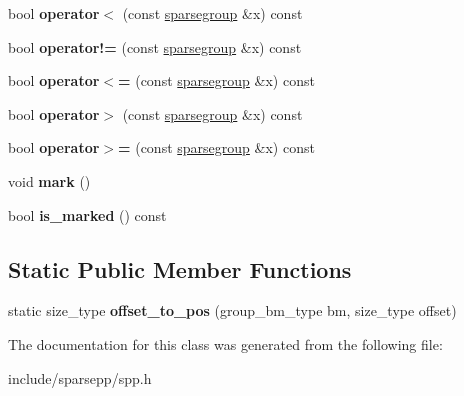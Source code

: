 \begin{DoxyCompactItemize}
\item 
bool {\bfseries operator$<$} (const \hyperlink{classspp___1_1sparsegroup}{sparsegroup} \&x) const \hypertarget{classspp___1_1sparsegroup_ae0e61b3467b0cb2c52a2d6a678966e03}{}\label{classspp___1_1sparsegroup_ae0e61b3467b0cb2c52a2d6a678966e03}

\item 
bool {\bfseries operator!=} (const \hyperlink{classspp___1_1sparsegroup}{sparsegroup} \&x) const \hypertarget{classspp___1_1sparsegroup_a2d51d3cd462d21506a8719d0058ceacf}{}\label{classspp___1_1sparsegroup_a2d51d3cd462d21506a8719d0058ceacf}

\item 
bool {\bfseries operator$<$=} (const \hyperlink{classspp___1_1sparsegroup}{sparsegroup} \&x) const \hypertarget{classspp___1_1sparsegroup_a8e22369b827ab8347b88507f3d99df89}{}\label{classspp___1_1sparsegroup_a8e22369b827ab8347b88507f3d99df89}

\item 
bool {\bfseries operator$>$} (const \hyperlink{classspp___1_1sparsegroup}{sparsegroup} \&x) const \hypertarget{classspp___1_1sparsegroup_a483397eb3c0c3cc30ac3ba18e68a2ccf}{}\label{classspp___1_1sparsegroup_a483397eb3c0c3cc30ac3ba18e68a2ccf}

\item 
bool {\bfseries operator$>$=} (const \hyperlink{classspp___1_1sparsegroup}{sparsegroup} \&x) const \hypertarget{classspp___1_1sparsegroup_a54be79769e48bd9abde4170b3a56b642}{}\label{classspp___1_1sparsegroup_a54be79769e48bd9abde4170b3a56b642}

\item 
void {\bfseries mark} ()\hypertarget{classspp___1_1sparsegroup_a746a5749592185e407c7d7804820fa93}{}\label{classspp___1_1sparsegroup_a746a5749592185e407c7d7804820fa93}

\item 
bool {\bfseries is\+\_\+marked} () const \hypertarget{classspp___1_1sparsegroup_aff985c9c5aa3b0e1844e021fe63f3e84}{}\label{classspp___1_1sparsegroup_aff985c9c5aa3b0e1844e021fe63f3e84}

\end{DoxyCompactItemize}
\subsection*{Static Public Member Functions}
\begin{DoxyCompactItemize}
\item 
static size\+\_\+type {\bfseries offset\+\_\+to\+\_\+pos} (group\+\_\+bm\+\_\+type bm, size\+\_\+type offset)\hypertarget{classspp___1_1sparsegroup_a19cf14202daaa62a51956c64462c01c0}{}\label{classspp___1_1sparsegroup_a19cf14202daaa62a51956c64462c01c0}

\end{DoxyCompactItemize}


The documentation for this class was generated from the following file\+:\begin{DoxyCompactItemize}
\item 
include/sparsepp/spp.\+h\end{DoxyCompactItemize}
